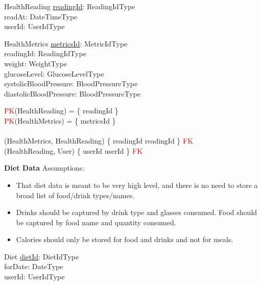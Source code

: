 \documentclass{article}
\begin{document}
\begin{schema}{HealthReading}
	\underline{readingId}: ReadingIdType \\
    readAt: DateTimeType \\
    userId: UserIdType \\
\end{schema}
\vspace{-0.75cm}
\begin{schema}{HealthMetrics}
    \underline{metricsId}: MetricIdType \\
    readingId: ReadingIdType \\
    weight: WeightType \\ 
    glucoseLevel: GlucoseLevelType \\
    systolicBloodPressure: BloodPressureType \\
    diastolicBloodPressure: BloodPressureType \\
\end{schema}
\begin{zed}
\textcolor{red}{PK}(HealthReading) = \{ readingId \} \\ 
\textcolor{red}{PK}(HealthMetrics) = \{ metricsId \} \\
\newline \\ 
(HealthMetrics, HealthReading) \mapsto \{ readingId \mapsto readingId \} \in \textcolor{red}{FK} \\
(HealthReading, User) \mapsto \{ userId \mapsto userId \} \in \textcolor{red}{FK} \\
\end{zed}
\newline
\textbf{Diet Data}
\newline \newline Assumptions:
\begin{itemize}
  \item That diet data is meant to be very high level, and there is no need to store a broad list of food/drink types/names. 
  \item Drinks should be captured by drink type and glasses consumed. Food should be captured by food name and quantity consumed.
  \item Calories should only be stored for food and drinks and not for meals. 
\end{itemize}
\begin{schema}{Diet}
  \underline{dietId}: DietIdType \\
  forDate: DateType \\
  userId: UserIdType \\
\end{schema}
\end{document}
